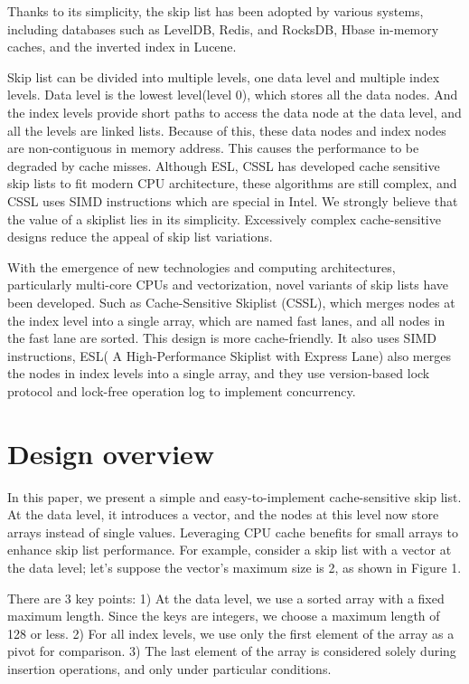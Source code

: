 \documentclass[sigconf, nonacm, letterpaper,top=2cm,bottom=2cm,left=3cm,right=3cm,marginparwidth=1.75cm]{acmart}
\begin{document}
Thanks to its simplicity, the skip list has been adopted by various systems, including databases such as LevelDB\cite{ref2}, Redis\cite{ref7}, and RocksDB\cite{ref3}, Hbase\cite{ref4} in-memory caches, and the inverted index in Lucene.

Skip list can be divided into multiple levels, one data level and multiple index levels. Data level is the lowest level(level 0), which stores all the data nodes. And the index levels provide short paths to access the data node at the data level, and all the levels are linked lists. Because of this, these data nodes and index nodes are non-contiguous in memory address. This causes the performance to be degraded by cache misses.
Although ESL, CSSL has developed cache sensitive skip lists to fit modern CPU architecture, these algorithms are still complex, and CSSL uses SIMD instructions which are special in Intel. We strongly believe that the value of a skiplist lies in its simplicity.  Excessively complex cache-sensitive designs reduce the appeal of skip list variations.

With the emergence of new technologies and computing architectures, particularly multi-core CPUs and vectorization, novel variants of skip lists have been developed. Such as Cache-Sensitive Skiplist (CSSL)\cite{ref5}, which merges nodes at the index level into a single array, which are named fast lanes, and all nodes in the fast lane are sorted. This design is more cache-friendly. It also uses SIMD instructions, ESL( A High-Performance Skiplist with Express Lane\cite{ref6})  also merges the nodes in index levels into a single array, and they use version-based lock protocol and lock-free operation log to implement concurrency. 



\section{Design overview}

In this paper, we present a simple and easy-to-implement cache-sensitive skip list. At the data level, it introduces a vector, and the nodes at this level now store arrays instead of single values. Leveraging CPU cache benefits for small arrays to enhance skip list performance. For example, consider a skip list with a vector at the data level; let's suppose the vector's maximum size is 2, as shown in Figure 1. 

There are 3 key points: 1) At the data level, we use a sorted array with a fixed maximum length. Since the keys are integers, we choose a maximum length of 128 or less. 2) For all index levels, we use only the first element of the array as a pivot for comparison. 3) The last element of the array is considered solely during insertion operations, and only under particular conditions.
\end{document}
